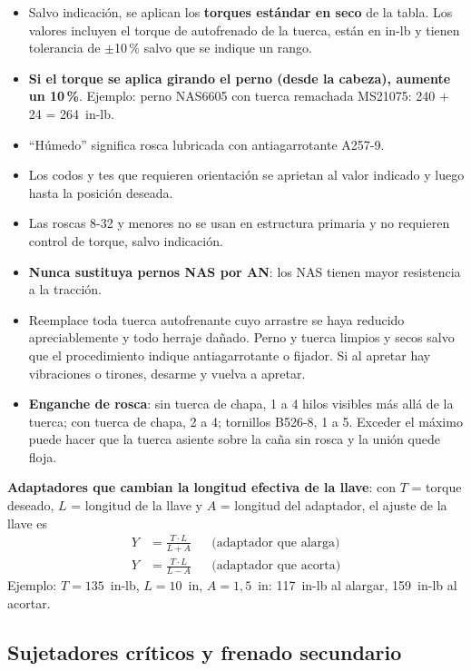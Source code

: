\begin{itemize}
\item Salvo indicación, se aplican los \textbf{torques estándar en seco} de la tabla. Los valores incluyen el torque de autofrenado de la tuerca, están en in-lb y tienen tolerancia de $\pm$10\,\% salvo que se indique un rango.
\item \textbf{Si el torque se aplica girando el perno (desde la cabeza), aumente un 10\,\%}. Ejemplo: perno NAS6605 con tuerca remachada MS21075: 240 + 24 = 264~in-lb.
\item ``Húmedo'' significa rosca lubricada con antiagarrotante A257-9.
\item Los codos y tes que requieren orientación se aprietan al valor indicado y luego hasta la posición deseada.
\item Las roscas 8-32 y menores no se usan en estructura primaria y no requieren control de torque, salvo indicación.
\item \textbf{Nunca sustituya pernos NAS por AN}: los NAS tienen mayor resistencia a la tracción.
\item Reemplace toda tuerca autofrenante cuyo arrastre se haya reducido apreciablemente y todo herraje dañado. Perno y tuerca limpios y secos salvo que el procedimiento indique antiagarrotante o fijador. Si al apretar hay vibraciones o tirones, desarme y vuelva a apretar.
\item \textbf{Enganche de rosca}: sin tuerca de chapa, 1 a 4 hilos visibles más allá de la tuerca; con tuerca de chapa, 2 a 4; tornillos B526-8, 1 a 5. Exceder el máximo puede hacer que la tuerca asiente sobre la caña sin rosca y la unión quede floja.
\end{itemize}

\textbf{Adaptadores que cambian la longitud efectiva de la llave}: con $T$ = torque deseado, $L$ = longitud de la llave y $A$ = longitud del adaptador, el ajuste de la llave es
\begin{align*}
Y &= \frac{T \cdot L}{L + A} && \text{(adaptador que alarga)}\\
Y &= \frac{T \cdot L}{L - A} && \text{(adaptador que acorta)}
\end{align*}
Ejemplo: $T = 135$~in-lb, $L = 10$~in, $A = 1{,}5$~in: 117~in-lb al alargar, 159~in-lb al acortar.

\subsection{Sujetadores críticos y frenado secundario}

